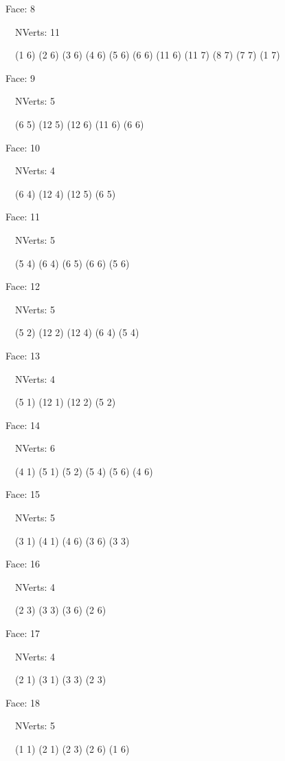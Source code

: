 \documentclass{article}
\begin{document}
{\footnotesize 

Face: 8

\   \    NVerts: 11

 \   \   (1 6) (2 6) (3 6) (4 6) (5 6) (6 6) (11 6) (11 7) (8 7) (7 7) (1 7)}

{\footnotesize 

Face: 9

\   \    NVerts: 5

 \   \   (6 5) (12 5) (12 6) (11 6) (6 6)}

{\footnotesize 

Face: 10

\   \    NVerts: 4

 \   \   (6 4) (12 4) (12 5) (6 5)}

{\footnotesize 

Face: 11

\   \    NVerts: 5

 \   \   (5 4) (6 4) (6 5) (6 6) (5 6)}

{\footnotesize 

Face: 12

\   \    NVerts: 5

 \   \   (5 2) (12 2) (12 4) (6 4) (5 4)}

{\footnotesize 

Face: 13

\   \    NVerts: 4

 \   \   (5 1) (12 1) (12 2) (5 2)}

{\footnotesize 

Face: 14

\   \    NVerts: 6

 \   \   (4 1) (5 1) (5 2) (5 4) (5 6) (4 6)}

{\footnotesize 

Face: 15

\   \    NVerts: 5

 \   \   (3 1) (4 1) (4 6) (3 6) (3 3)}

{\footnotesize 

Face: 16

\   \    NVerts: 4

 \   \   (2 3) (3 3) (3 6) (2 6)}

{\footnotesize 

Face: 17

\   \    NVerts: 4

 \   \   (2 1) (3 1) (3 3) (2 3)}

{\footnotesize 

Face: 18

\   \    NVerts: 5

 \   \   (1 1) (2 1) (2 3) (2 6) (1 6)}
\end{document}
